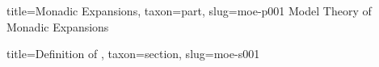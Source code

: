 \documentclass[a4paper]{article}
\begin{document}
  
  
\begin{tree}{title={Monadic Expansions}, taxon={part}, slug={moe-p001}}
Model Theory of Monadic Expansions
  
  
\begin{tree}{title={Definition of }, taxon={section}, slug={moe-s001}}

\end{tree}


\end{tree}


\printbibliography
\end{document}
